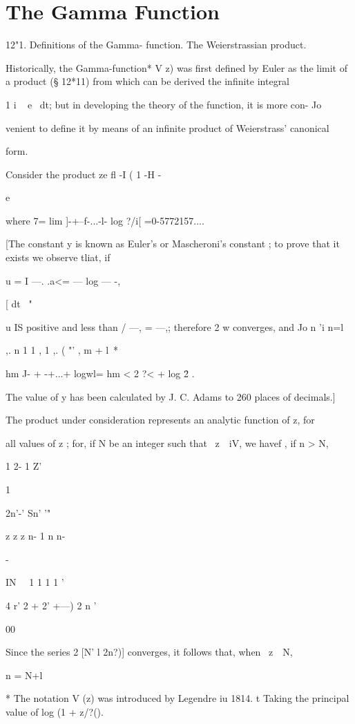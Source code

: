 \chapter{The Gamma Function} 

12"1. Definitions of the Gamma- function. The Weierstrassian product.

Historically, the Gamma-function* V z) was first defined by Euler as
the limit of a product (§ 12*11) from which can be derived the
infinite integral

1 i ~ e~ dt; but in developing the theory of the function, it is more
con- Jo

venient to define it by means of an infinite product of Weierstrass'
canonical

form.

Consider the product ze fl -I ( 1 -H -

e

where 7= lim ]-+--f-...-l- log ?/i[ =0-5772157....

[The constant y is known as Euler's or Mascheroni's constant ; to
prove that it exists we observe tliat, if

u = I —. .a<= — log — -,

[ dt \ "

u IS positive and less than / —, = —,; therefore 2 w converges, and Jo
n 'i n=l

,. n 1 1 , 1 ,. ( "' , m + l\ *

hm J- + -+...+ logwl= hm < 2 ?< + log \= 2 .

The value of y has been calculated by J. C. Adams to 260 places of
decimals.]

The product under consideration represents an analytic function of z,
for

all values of z ; for, if N be an integer such that \ z\ \ iV, we
havef , if n > N,

1 2- 1 Z'

1

2n'-' Sn' '"

  

z z z n- 1 n n-

-

IN \ \ 1 1 1 1 '

 4 r' 2 + 2' +---) 2 n '

00

Since the series 2 [N' l 2n?)] converges, it follows that, when \ z\ \
N,

n = N+l

* The notation V (z) was introduced by Legendre iu 1814. t Taking the
principal value of log (1 + z/?().

